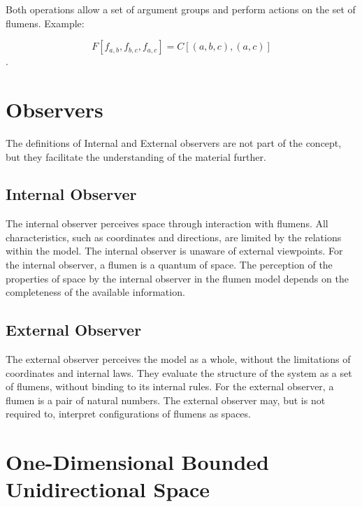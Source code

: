 \documentclass[final]{article}
\begin{document}
        Both operations allow a set of argument groups and perform
        actions on the set of flumens. Example:

        \[ F[f_{a,b}, f_{b,c}, f_{a,c}] = C[(a,b,c), (a,c)]\].



    \section{Observers}

        The definitions of Internal and External observers are not part of the 
        concept, but they facilitate the understanding of the material further.

        \subsection{Internal Observer}

            The internal observer perceives space through interaction with 
            flumens. All characteristics, such as coordinates and directions, 
            are limited by the relations within the model. The internal observer 
            is unaware of external viewpoints. For the internal observer, a 
            flumen is a quantum of space. The perception of the properties of 
            space by the internal observer in the flumen model depends on the 
            completeness of the available information.

        \subsection{External Observer}

            The external observer perceives the model as a whole, without the 
            limitations of coordinates and internal laws. They evaluate the 
            structure of the system as a set of flumens, without binding to its 
            internal rules. For the external observer, a flumen is a pair of 
            natural numbers. The external observer may, but is not required to, 
            interpret configurations of flumens as spaces.



    \section{One-Dimensional Bounded Unidirectional Space}
\end{document}

